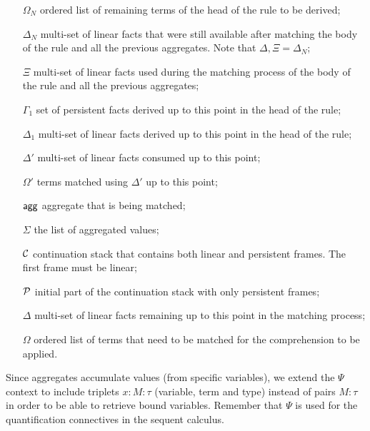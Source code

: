 \begin{enumerate}
   \item[$\Omega_N$] ordered list of remaining terms of the head of the rule to
   be derived;

   \item[$\Delta_N$] multi-set of linear facts that were still available after
   matching the body of the rule and all the previous aggregates. Note that
   $\Delta, \Xi = \Delta_N$;

   \item[$\Xi$] multi-set of linear facts used during the matching process of
   the body of the rule and all the previous aggregates;

   \item[$\Gamma_{1}$] set of persistent facts derived up to this point in the
   head of the rule;

   \item[$\Delta_{1}$] multi-set of linear facts derived up to this point in
   the head of the rule;

   \item[$\Delta'$] multi-set of linear facts consumed up to this point;

   \item[$\Omega'$] terms matched using $\Delta'$ up to this point;

   \item[$\mathsf{agg}$] aggregate that is being matched;

   \item[$\Sigma$] the list of aggregated values;

   \item[$\mathcal{C}$] continuation stack that contains both linear and persistent
   frames. The first frame must be linear;

   \item[$\mathcal{P}$] initial part of the continuation stack with only persistent
   frames;

   \item[$\Delta$] multi-set of linear facts remaining up to this point in the
   matching process;

   \item[$\Omega$] ordered list of terms that need to be matched for the
   comprehension to be applied.

\end{enumerate}

Since aggregates accumulate values (from specific variables), we extend the
$\Psi$ context to include triplets $x : M : \tau$ (variable, term and type)
instead of pairs $M : \tau$ in order to be able to retrieve bound variables.
Remember that $\Psi$ is used for the quantification connectives in the sequent
calculus.

